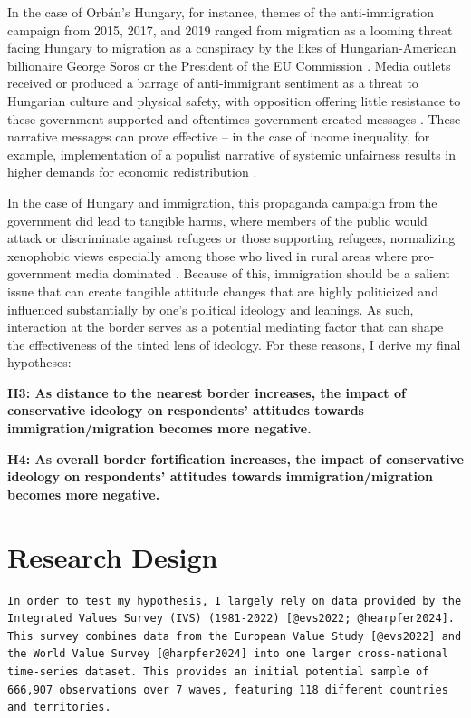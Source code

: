 \documentclass[12pt,]{article}
\begin{document}
In the case of Orbán's Hungary, for instance, themes of the
anti-immigration campaign from 2015, 2017, and 2019 ranged from
migration as a looming threat facing Hungary to migration as a
conspiracy by the likes of Hungarian-American billionaire George Soros
or the President of the EU Commission \citep{bajomi-lazar2019}. Media
outlets received or produced a barrage of anti-immigrant sentiment as a
threat to Hungarian culture and physical safety, with opposition
offering little resistance to these government-supported and oftentimes
government-created messages \citep{bajomi-lazar2019}. These narrative
messages can prove effective -- in the case of income inequality, for
example, implementation of a populist narrative of systemic unfairness
results in higher demands for economic redistribution
\citep{culpepper2024}.

In the case of Hungary and immigration, this propaganda campaign from
the government did lead to tangible harms, where members of the public
would attack or discriminate against refugees or those supporting
refugees, normalizing xenophobic views especially among those who lived
in rural areas where pro-government media dominated
\citep{bajomi-lazar2019}. Because of this, immigration should be a
salient issue that can create tangible attitude changes that are highly
politicized and influenced substantially by one's political ideology and
leanings. As such, interaction at the border serves as a potential
mediating factor that can shape the effectiveness of the tinted lens of
ideology. For these reasons, I derive my final hypotheses:

\textbf{H3: As distance to the nearest border increases, the impact of
conservative ideology on respondents' attitudes towards
immigration/migration becomes more negative.}

\textbf{H4: As overall border fortification increases, the impact of
conservative ideology on respondents' attitudes towards
immigration/migration becomes more negative.}

\section{Research Design}\label{research-design}

\begin{verbatim}
In order to test my hypothesis, I largely rely on data provided by the Integrated Values Survey (IVS) (1981-2022) [@evs2022; @hearpfer2024]. This survey combines data from the European Value Study [@evs2022] and the World Value Survey [@harpfer2024] into one larger cross-national time-series dataset. This provides an initial potential sample of 666,907 observations over 7 waves, featuring 118 different countries and territories. 
\end{verbatim}
\end{document}

